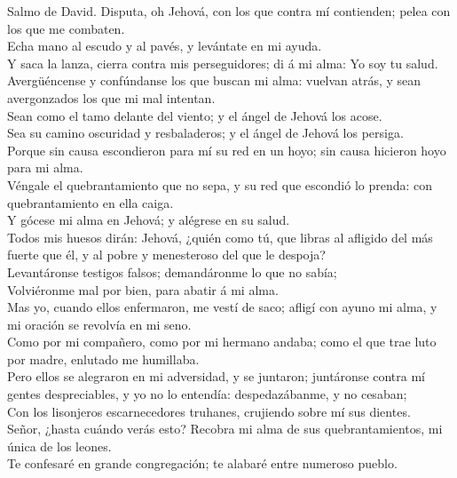  Salmo de David. Disputa, oh Jehová, con los que contra mí
contienden; pelea con los que me combaten.\\
 Echa mano al escudo y al pavés, y levántate en mi
ayuda.\\
 Y saca la lanza, cierra contra mis perseguidores; di á mi
alma: Yo soy tu salud.\\
 Avergüéncense y confúndanse los que buscan mi alma:
vuelvan atrás, y sean avergonzados los que mi mal intentan.\\
 Sean como el tamo delante del viento; y el ángel de
Jehová los acose.\\
 Sea su camino oscuridad y resbaladeros; y el ángel de
Jehová los persiga.\\
 Porque sin causa escondieron para mí su red en un hoyo;
sin causa hicieron hoyo para mi alma.\\
 Véngale el quebrantamiento que no sepa, y su red que
escondió lo prenda: con quebrantamiento en ella caiga.\\
 Y gócese mi alma en Jehová; y alégrese en su salud.\\
 Todos mis huesos dirán: Jehová, ¿quién como tú, que
libras al afligido del más fuerte que él, y al pobre y menesteroso del
que le despoja?\\
 Levantáronse testigos falsos; demandáronme lo que no
sabía;\\
 Volviéronme mal por bien, para abatir á mi alma.\\
 Mas yo, cuando ellos enfermaron, me vestí de saco;
afligí con ayuno mi alma, y mi oración se revolvía en mi seno.\\
 Como por mi compañero, como por mi hermano andaba; como
el que trae luto por madre, enlutado me humillaba.\\
 Pero ellos se alegraron en mi adversidad, y se juntaron;
juntáronse contra mí gentes despreciables, y yo no lo entendía:
despedazábanme, y no cesaban;\\
 Con los lisonjeros escarnecedores truhanes, crujiendo
sobre mí sus dientes.\\
 Señor, ¿hasta cuándo verás esto? Recobra mi alma de sus
quebrantamientos, mi única de los leones.\\
 Te confesaré en grande congregación; te alabaré entre
numeroso pueblo.\\
